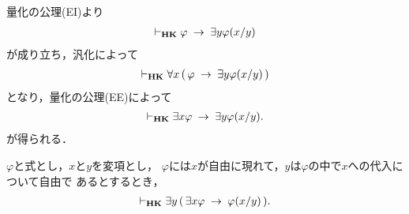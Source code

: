 	\begin{sketch}
		量化の公理(EI)より
		\begin{align}
			\vdash_{{\scriptsize \mbox{{\bf HK}}}} \varphi \hspace{0.25em}\rightarrow\hspace{0.25em} \exists y \varphi(x/y)
		\end{align}
		が成り立ち，汎化によって
		\begin{align}
			\vdash_{{\scriptsize \mbox{{\bf HK}}}} \forall x\, (\, \varphi \hspace{0.25em}\rightarrow\hspace{0.25em} \exists y \varphi(x/y)\, )
		\end{align}
		となり，量化の公理(EE)によって
		\begin{align}
			\vdash_{{\scriptsize \mbox{{\bf HK}}}} \exists x \varphi \hspace{0.25em}\rightarrow\hspace{0.25em} \exists y \varphi(x/y).
		\end{align}
		が得られる．
		\QED
	\end{sketch}
	
	\begin{screen}
		\begin{thm}\label{classic:lemma_for_Henkin_expansion}
			$\varphi$と式とし，$x$と$y$を変項とし，
			$\varphi$には$x$が自由に現れて，$y$は$\varphi$の中で$x$への代入について自由で
			あるとするとき，
			\begin{align}
				\vdash_{{\scriptsize \mbox{{\bf HK}}}} \exists y\, (\, \exists x \varphi \hspace{0.25em}\rightarrow\hspace{0.25em} \varphi(x/y)\, ).
			\end{align}
		\end{thm}
	\end{screen}
	
